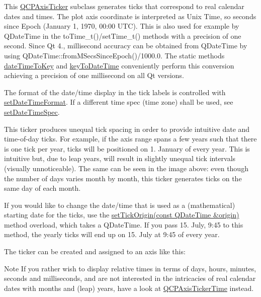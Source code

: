 This \hyperlink{class_q_c_p_axis_ticker}{Q\+C\+P\+Axis\+Ticker} subclass generates ticks that correspond to real calendar dates and times. The plot axis coordinate is interpreted as Unix Time, so seconds since Epoch (January 1, 1970, 00\+:00 U\+TC). This is also used for example by Q\+Date\+Time in the {\ttfamily to\+Time\+\_\+t()/set\+Time\+\_\+t()} methods with a precision of one second. Since Qt 4., millisecond accuracy can be obtained from Q\+Date\+Time by using {\ttfamily Q\+Date\+Time\+::from\+M\+Secs\+Since\+Epoch()/1000.0}. The static methods \hyperlink{class_q_c_p_axis_ticker_date_time_aa24f293f16fff0f937bf71f4140033f1}{date\+Time\+To\+Key} and \hyperlink{class_q_c_p_axis_ticker_date_time_a4c1761ad057f5564804a53f942629b53}{key\+To\+Date\+Time} conveniently perform this conversion achieving a precision of one millisecond on all Qt versions.

The format of the date/time display in the tick labels is controlled with \hyperlink{class_q_c_p_axis_ticker_date_time_ad52660a82f688395468674d555f6a86b}{set\+Date\+Time\+Format}. If a different time spec (time zone) shall be used, see \hyperlink{class_q_c_p_axis_ticker_date_time_afbd987c7197e42ab61e67fb1c38abebc}{set\+Date\+Time\+Spec}.

This ticker produces unequal tick spacing in order to provide intuitive date and time-\/of-\/day ticks. For example, if the axis range spans a few years such that there is one tick per year, ticks will be positioned on 1. January of every year. This is intuitive but, due to leap years, will result in slightly unequal tick intervals (visually unnoticeable). The same can be seen in the image above\+: even though the number of days varies month by month, this ticker generates ticks on the same day of each month.

If you would like to change the date/time that is used as a (mathematical) starting date for the ticks, use the \hyperlink{class_q_c_p_axis_ticker_date_time_a2ea905872b8171847a49a5e093fb0c48}{set\+Tick\+Origin(const Q\+Date\+Time \&origin)} method overload, which takes a Q\+Date\+Time. If you pass 15. July, 9\+:45 to this method, the yearly ticks will end up on 15. July at 9\+:45 of every year.

The ticker can be created and assigned to an axis like this\+: 
\begin{DoxyCodeInclude}
\end{DoxyCodeInclude}
 \begin{DoxyNote}{Note}
If you rather wish to display relative times in terms of days, hours, minutes, seconds and milliseconds, and are not interested in the intricacies of real calendar dates with months and (leap) years, have a look at \hyperlink{class_q_c_p_axis_ticker_time}{Q\+C\+P\+Axis\+Ticker\+Time} instead. 
\end{DoxyNote}


